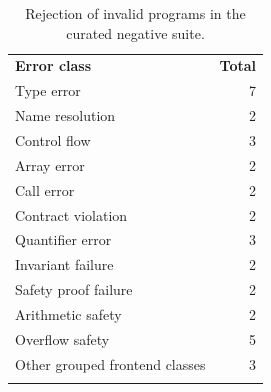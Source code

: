 \begin{table}[h]
  \centering
  \small
  \begin{tabular}{l r}
    \tablehline
    \textbf{Error class}           & \textbf{Total} \\
    \tablehline
    Type error                     & 7              \\
    Name resolution                & 2              \\
    Control flow                   & 3              \\
    Array error                    & 2              \\
    Call error                     & 2              \\
    Contract violation             & 2              \\
    Quantifier error               & 3              \\
    Invariant failure              & 2              \\
    Safety proof failure           & 2              \\
    Arithmetic safety              & 2              \\
    Overflow safety                & 5              \\
    Other grouped frontend classes & 3              \\
    \tablehline
  \end{tabular}
  \caption{Rejection of invalid programs in the curated negative suite.}
  \label{tab:negative-suite-summary}
\end{table}

